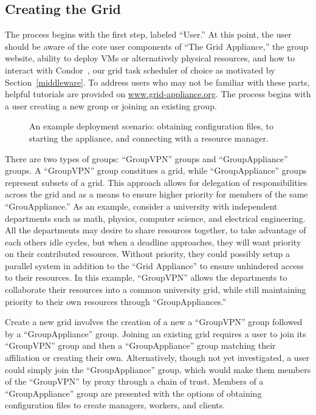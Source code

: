 \documentclass[conference]{IEEEtran}
\begin{document}
\subsection{Creating the Grid}

The process begins with the first step, labeled ``User.'' At this point, the
user should be aware of the core user components of ``The Grid Appliance,'' the
group website, ability to deploy VMs or alternatively physical resources, and
how to interact with Condor~\cite{condor0}, our grid task scheduler of choice as
motivated by Section~\ref{middleware}.  To address users who may not be
familiar with these parts, helpful tutorials are provided on
\url{www.grid-appliance.org}.  The process begins with a user creating a new
group or joining an existing group.

\begin{figure}[ht]
\centering
{}
\caption{An example deployment scenario:  obtaining configuration files, to
starting the appliance, and connecting with a resource manager.}
\label{fig:system}
\end{figure}

There are two types of groups:  ``GroupVPN'' groups and ``GroupAppliance''
groups. A ``GroupVPN'' group constitues a grid, while ``GroupAppliance'' groups
represent subsets of a grid.  This approach allows for delegation of
responsibilities across the grid and as a means to ensure higher priority for
members of the same ``GrouAppliance.'' As an example, consider a university
with independent departments such as math, physics, computer science, and
electrical engineering.  All the departments may desire to share resources
together, to take advantage of each others idle cycles, but when a deadline
approaches, they will want priority on their contributed resources.  Without
priority, they could possibly setup a parallel system in addition to the ``Grid
Appliance'' to ensure unhindered access to their resources.  In this example,
``GroupVPN'' allows the departments to collaborate their resources into a
common university grid, while still maintaining priority to their own resources
through ``GroupAppliances.''

Create a new grid involves the creation of a new a ``GroupVPN'' group followed
by a ``GroupAppliance'' group.  Joining an existing grid requires a user to
join its ``GroupVPN'' group and then a ``GroupAppliance'' group matching their
affiliation or creating their own.  Alternatively, though not yet investigated,
a user could simply join the ``GroupAppliance'' group, which would make them
members of the ``GroupVPN'' by proxy through a chain of trust.  Members of a
``GroupAppliance'' group are presented with the options of obtaining
configuration files to create managers, workers, and clients.
\end{document}
